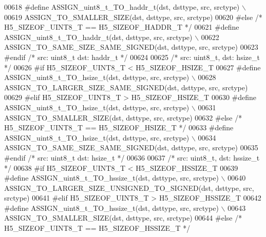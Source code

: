 \begin{DoxyCode}
00618 \textcolor{preprocessor}{    #define ASSIGN\_uint8\_t\_TO\_haddr\_t(dst, dsttype, src, srctype) \(\backslash\)}
00619 \textcolor{preprocessor}{        ASSIGN\_TO\_SMALLER\_SIZE(dst, dsttype, src, srctype)}
00620 \textcolor{preprocessor}{#else }\textcolor{comment}{/* H5\_SIZEOF\_UINT8\_T == H5\_SIZEOF\_HADDR\_T */}\textcolor{preprocessor}{}
00621 \textcolor{preprocessor}{    #define ASSIGN\_uint8\_t\_TO\_haddr\_t(dst, dsttype, src, srctype) \(\backslash\)}
00622 \textcolor{preprocessor}{        ASSIGN\_TO\_SAME\_SIZE\_SAME\_SIGNED(dst, dsttype, src, srctype)}
00623 \textcolor{preprocessor}{#endif }\textcolor{comment}{/* src: uint8\_t dst: haddr\_t */}\textcolor{preprocessor}{}
00624 
00625 \textcolor{comment}{/* src: uint8\_t, dst: hsize\_t */}
00626 \textcolor{preprocessor}{#if H5\_SIZEOF\_UINT8\_T < H5\_SIZEOF\_HSIZE\_T}
00627 \textcolor{preprocessor}{    #define ASSIGN\_uint8\_t\_TO\_hsize\_t(dst, dsttype, src, srctype) \(\backslash\)}
00628 \textcolor{preprocessor}{        ASSIGN\_TO\_LARGER\_SIZE\_SAME\_SIGNED(dst, dsttype, src, srctype)}
00629 \textcolor{preprocessor}{#elif H5\_SIZEOF\_UINT8\_T > H5\_SIZEOF\_HSIZE\_T}
00630 \textcolor{preprocessor}{    #define ASSIGN\_uint8\_t\_TO\_hsize\_t(dst, dsttype, src, srctype) \(\backslash\)}
00631 \textcolor{preprocessor}{        ASSIGN\_TO\_SMALLER\_SIZE(dst, dsttype, src, srctype)}
00632 \textcolor{preprocessor}{#else }\textcolor{comment}{/* H5\_SIZEOF\_UINT8\_T == H5\_SIZEOF\_HSIZE\_T */}\textcolor{preprocessor}{}
00633 \textcolor{preprocessor}{    #define ASSIGN\_uint8\_t\_TO\_hsize\_t(dst, dsttype, src, srctype) \(\backslash\)}
00634 \textcolor{preprocessor}{        ASSIGN\_TO\_SAME\_SIZE\_SAME\_SIGNED(dst, dsttype, src, srctype)}
00635 \textcolor{preprocessor}{#endif }\textcolor{comment}{/* src: uint8\_t dst: hsize\_t */}\textcolor{preprocessor}{}
00636 
00637 \textcolor{comment}{/* src: uint8\_t, dst: hssize\_t */}
00638 \textcolor{preprocessor}{#if H5\_SIZEOF\_UINT8\_T < H5\_SIZEOF\_HSSIZE\_T}
00639 \textcolor{preprocessor}{    #define ASSIGN\_uint8\_t\_TO\_hssize\_t(dst, dsttype, src, srctype) \(\backslash\)}
00640 \textcolor{preprocessor}{        ASSIGN\_TO\_LARGER\_SIZE\_UNSIGNED\_TO\_SIGNED(dst, dsttype, src, srctype)}
00641 \textcolor{preprocessor}{#elif H5\_SIZEOF\_UINT8\_T > H5\_SIZEOF\_HSSIZE\_T}
00642 \textcolor{preprocessor}{    #define ASSIGN\_uint8\_t\_TO\_hssize\_t(dst, dsttype, src, srctype) \(\backslash\)}
00643 \textcolor{preprocessor}{        ASSIGN\_TO\_SMALLER\_SIZE(dst, dsttype, src, srctype)}
00644 \textcolor{preprocessor}{#else }\textcolor{comment}{/* H5\_SIZEOF\_UINT8\_T == H5\_SIZEOF\_HSSIZE\_T */}\textcolor{preprocessor}{}

\end{DoxyCode}
